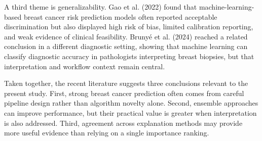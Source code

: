 \documentclass[conference]{IEEEtran}
\begin{document}
A third theme is generalizability. Gao et al. (2022) found that machine-learning-based breast cancer risk prediction models often reported acceptable discrimination but also displayed high risk of bias, limited calibration reporting, and weak evidence of clinical feasibility. Bruny\'e et al. (2024) reached a related conclusion in a different diagnostic setting, showing that machine learning can classify diagnostic accuracy in pathologists interpreting breast biopsies, but that interpretation and workflow context remain central.

Taken together, the recent literature suggests three conclusions relevant to the present study. First, strong breast cancer prediction often comes from careful pipeline design rather than algorithm novelty alone. Second, ensemble approaches can improve performance, but their practical value is greater when interpretation is also addressed. Third, agreement across explanation methods may provide more useful evidence than relying on a single importance ranking.
\end{document}
